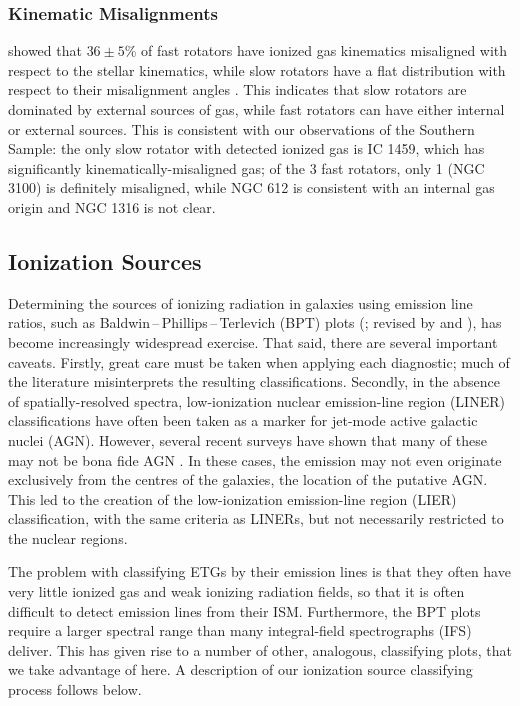 \documentclass[a4paper,fleqn,usenatbib]{mnras}
\begin{document}
		\subsubsection{Kinematic Misalignments}
			\citet{Davis2011a} showed that $36\pm5$\% of fast rotators have ionized gas kinematics misaligned with respect to the stellar kinematics, while slow rotators have a flat distribution with respect to their misalignment angles \citep[see fig.\ 4]{Davis2011a}. This indicates that slow rotators are dominated by external sources of gas, while fast rotators can have either internal or external sources. This is consistent with our observations of the Southern Sample: the only slow rotator with detected ionized gas is IC 1459, which has significantly kinematically-misaligned gas; of the 3 fast rotators, only 1 (NGC 3100) is definitely misaligned, while NGC 612 is consistent with an internal gas origin and NGC 1316 is not clear. %


	\subsection{Ionization Sources}
		\label{subsec:Diagnostics}
		Determining the sources of ionizing radiation in galaxies using emission line ratios, such as Baldwin\,--\,Phillips\,--\,Terlevich (BPT) plots (\citealt{Baldwin1981}; revised by \citealt{Kewley2001, Kewley2006} and \citealt{Kauffmann2003a}), has become increasingly widespread exercise. That said, there are several important caveats. Firstly, great care must be taken when applying each diagnostic; much of the literature misinterprets the resulting classifications. Secondly, in the absence of spatially-resolved spectra, low-ionization nuclear emission-line region (LINER) classifications have often been taken as a marker for jet-mode active galactic nuclei (AGN). However, several recent surveys have shown that many of these may not be bona fide AGN \citep[e.g.][]{Sarzi2005, Sarzi2010, Singh2013, Belfiore2016a}. In these cases, the emission may not even originate exclusively from the centres of the galaxies, the location of the putative AGN. This led to the creation of the low-ionization emission-line region (LIER) classification, with the same criteria as LINERs, but not necessarily restricted to the nuclear regions.

		The problem with classifying ETGs by their emission lines is that they often have very little ionized gas and weak ionizing radiation fields, so that it is often difficult to detect emission lines from their ISM. Furthermore, the BPT plots require a larger spectral range than many integral-field spectrographs (IFS) deliver. This has given rise to a number of other, analogous, classifying plots, that we take advantage of here. A description of our ionization source classifying process follows below. 
\end{document}
